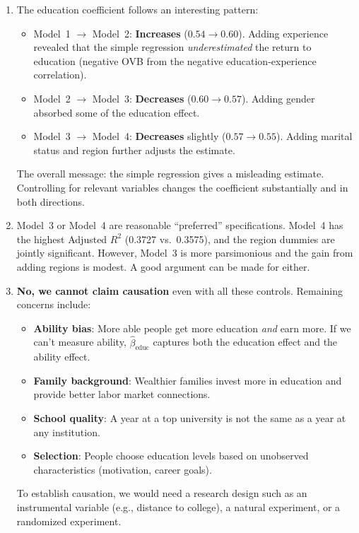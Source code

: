 \documentclass[11pt,letterpaper]{article}
\begin{document}
\begin{answer}
\begin{enumerate}[label=(\alph*)]
\item The education coefficient follows an interesting pattern:
\begin{itemize}[noitemsep]
\item Model~1 $\to$ Model~2: \textbf{Increases} ($0.54 \to 0.60$). Adding experience revealed that the simple regression \textit{underestimated} the return to education (negative OVB from the negative education-experience correlation).
\item Model~2 $\to$ Model~3: \textbf{Decreases} ($0.60 \to 0.57$). Adding gender absorbed some of the education effect.
\item Model~3 $\to$ Model~4: \textbf{Decreases} slightly ($0.57 \to 0.55$). Adding marital status and region further adjusts the estimate.
\end{itemize}
The overall message: the simple regression gives a misleading estimate. Controlling for relevant variables changes the coefficient substantially and in both directions.

\item Model~3 or Model~4 are reasonable ``preferred'' specifications. Model~4 has the highest Adjusted $R^2$ (0.3727 vs.\ 0.3575), and the region dummies are jointly significant. However, Model~3 is more parsimonious and the gain from adding regions is modest. A good argument can be made for either.

\item \textbf{No, we cannot claim causation} even with all these controls. Remaining concerns include:
\begin{itemize}[noitemsep]
\item \textbf{Ability bias}: More able people get more education \textit{and} earn more. If we can't measure ability, $\hat{\beta}_{\text{educ}}$ captures both the education effect and the ability effect.
\item \textbf{Family background}: Wealthier families invest more in education and provide better labor market connections.
\item \textbf{School quality}: A year at a top university is not the same as a year at any institution.
\item \textbf{Selection}: People choose education levels based on unobserved characteristics (motivation, career goals).
\end{itemize}
To establish causation, we would need a research design such as an instrumental variable (e.g., distance to college), a natural experiment, or a randomized experiment.
\end{enumerate}
\end{answer}
\end{document}

